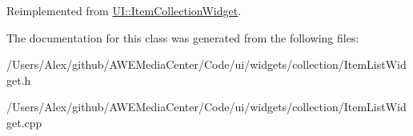 Reimplemented from \hyperlink{class_u_i_1_1_item_collection_widget_a7bae5ecd7edcfbf4378ca02fe9f14e74}{U\-I\-::\-Item\-Collection\-Widget}.



The documentation for this class was generated from the following files\-:\begin{DoxyCompactItemize}
\item 
/\-Users/\-Alex/github/\-A\-W\-E\-Media\-Center/\-Code/ui/widgets/collection/Item\-List\-Widget.\-h\item 
/\-Users/\-Alex/github/\-A\-W\-E\-Media\-Center/\-Code/ui/widgets/collection/Item\-List\-Widget.\-cpp\end{DoxyCompactItemize}
